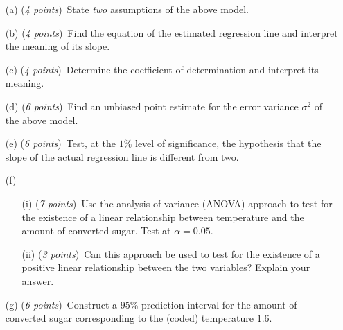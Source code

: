 \documentclass[12pt]{article}
\begin{document}
\begin{enumerate}
\item[(a)]
({\em 4 points\/})~State {\em two\/} assumptions of the above model.
\item[(b)]
({\em 4 points\/})~Find the equation of the estimated regression line and interpret the meaning of its slope.
\item[(c)]
({\em 4 points\/})~Determine the coefficient of determination and interpret its meaning.
\item[(d)]
({\em 6 points\/})~Find an unbiased point estimate for the error variance $\sigma^2$ of the above model.
\item[(e)]
({\em 6 points\/})~Test, at the $1\%$ level of significance, the hypothesis that the slope of the actual regression line is different from two.
\item[(f)]
\begin{enumerate}
\item[(i)]
({\em 7 points\/})~Use the analysis-of-variance (ANOVA) approach to test for the existence of a linear relationship between temperature and the amount of converted sugar. Test at $\alpha = 0.05$.
\item[(ii)]
({\em 3 points\/})~Can this approach be used to test for the existence of a positive linear relationship between the two variables? Explain your answer.
\end{enumerate}
\item[(g)]
({\em 6 points\/})~Construct a $95\%$ prediction interval for the amount of converted sugar corresponding to the (coded) temperature $1.6$.
\end{enumerate}

\newpage

\end{document}
